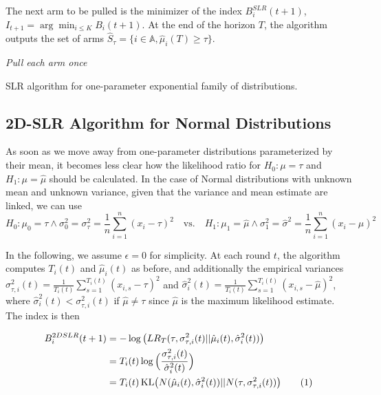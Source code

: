 \documentclass[11pt,]{article}
\newcommand{\KL}{\,\text{KL}}
\newcommand*{\Alignyesnumber}{\refstepcounter{equation}\tag{\theequation}}%
\begin{document}
The next arm to be pulled is the minimizer of the index
\(B_i^{SLR}(t+1)\), \(I_{t+1} = \arg \min_{i\leq K} B_i(t+1)\). At the
end of the horizon \(T\), the algorithm outputs the set of arms
\(\hat{S}_\tau = \{i \in \mathbb{A}, \hat{\mu}_i(T) \geq \tau\}\).

\IncMargin{1em}

\begin{algorithm}
\BlankLine
\emph{Pull each arm once}\;
\caption{SLR algorithm for one-parameter exponential family of distributions.}\label{algo_slr_1d}
\end{algorithm}

\DecMargin{1em}

\subsection{2D-SLR Algorithm for Normal
Distributions}\label{d-slr-algorithm-for-normal-distributions}

As soon as we move away from one-parameter distributions parameterized
by their mean, it becomes less clear how the likelihood ratio for
\(H_0: \mu = \tau\) and \(H_1: \mu = \hat{\mu}\) should be calculated.
In the case of Normal distributions with unknown mean and unknown
variance, given that the variance and mean estimate are linked, we can
use \[
H_0: \mu_0 = \tau \land \sigma_0^2 = \sigma^2_{\tau} = \frac{1}{n}\sum_{i=1}^{n}(x_i-\tau)^2 \quad \text{vs.} \quad H_1: \mu_1 = \hat{\mu} \land \sigma_1^2 = \hat{\sigma}^2 = \frac{1}{n}\sum_{i=1}^{n}(x_i-\hat{\mu})^2
\]

In the following, we assume \(\epsilon = 0\) for simplicity. At each
round \(t\), the algorithm computes \(T_i(t)\) and \(\hat{\mu}_i(t)\) as
before, and additionally the empirical variances
\(\sigma_{\tau,i}^2(t) = \frac{1}{T_i(t)}\sum_{s=1}^{T_i(t)}(x_{i,s}-\tau)^2\)
and
\(\hat{\sigma}_{i}^2(t) = \frac{1}{T_i(t)}\sum_{s=1}^{T_i(t)}(x_{i,s}-\hat{\mu})^2\),
where \(\hat{\sigma}_{i}^2(t) < \sigma_{\tau,i}^2(t)\) if
\(\hat{\mu} \neq \tau\) since \(\hat{\mu}\) is the maximum likelihood
estimate. The index is then

\begin{align*}
B_i^{2DSLR}(t+1) & = -\log\big(LR_T(\tau, \sigma_{\tau,i}^2(t)||\hat{\mu}_i(t),\hat{\sigma}^2_{i}(t))\big) \\
& = T_i(t) \log\Big(\frac{\sigma_{\tau,i}^2(t)}{\hat{\sigma}_i^2(t)}\Big) \\
& = T_i(t) \KL\big(N(\hat{\mu}_i(t),\hat{\sigma}^2_{i}(t))||N(\tau, \sigma_{\tau,i}^2(t))\big) \Alignyesnumber\label{eqn:SLR2DIndex}
\end{align*}
\end{document}
